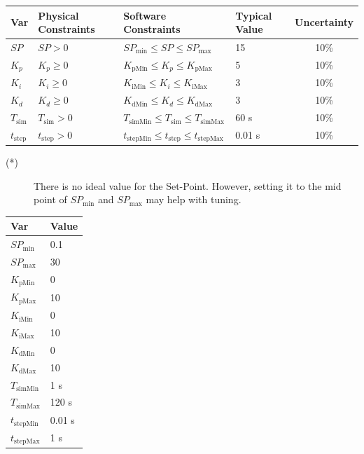 \documentclass[12pt]{article}
\begin{document}
\begin{table}[!h]
  \caption{Input Variables} \label{TblInputVar}
  \renewcommand{\arraystretch}{1.2}
\noindent \begin{longtable*}{l l l l c} 
  \toprule
  \textbf{Var} & \textbf{Physical Constraints} & \textbf{Software Constraints} &
                             \textbf{Typical Value} & \textbf{Uncertainty}\\
  \midrule 
  $SP$ & $SP > 0$ & $SP_{\text{min}} \leq SP \leq SP_{\text{max}}$ & 
  15 & 10\%
  \\
  $K_p$ & $K_p \geq 0$ & $K_\text{pMin} \leq K_p \leq K_\text{pMax}$ & 
  5 & 10\%
  \\
  $K_i$ & $K_i \geq 0$ & $K_{\text{iMin}} \leq K_i \leq K_{\text{iMax}}$ & 
  3 & 10\%
  \\
  $K_d$ & $K_d \geq 0$ & $K_{\text{dMin}} \leq K_d \leq K_{\text{dMax}}$ & 
  3 & 10\%
  \\
  $T_\text{sim}$ & $T_\text{sim} > 0$ & $T_\text{simMin} \leq T_\text{sim} \leq 
  T_\text{simMax}$ & 60 \si[per-mode=symbol] {\second} & 10\%
  \\
  $t_\text{step}$ & $t_\text{step} > 0$ & $t_\text{stepMin} \leq t_\text{step} 
  \leq t_\text{stepMax}$ & 0.01 \si[per-mode=symbol] {\second} & 10\%
  \\
  \bottomrule
\end{longtable*}
\end{table}

\noindent 
\begin{description}
\item[(*)] 
There is no ideal value for the Set-Point. However, setting it to the mid 
point of $SP_{\text{min}}$ and $SP_{\text{max}}$ may help with tuning.
\end{description}


\begin{table}[!h]
\caption{Specification Parameter Values} \label{TblSpecParams}
\renewcommand{\arraystretch}{1.2}
\noindent \begin{longtable*}{l l} 
  \toprule
  \textbf{Var} & \textbf{Value} \\
  \midrule 
  $SP_{\text{min}}$ & 0.1\\
  $SP_{\text{max}}$ & 30\\
  $K_\text{pMin}$ & 0  \\
  $K_\text{pMax}$ & 10 \\
  $K_\text{iMin}$ & 0 \\
  $K_\text{iMax}$ & 10 \\
  $K_\text{dMin}$ & 0 \\
  $K_\text{dMax}$ & 10 \\
  $T_\text{simMin}$ & 1 \si{\second}\\
  $T_\text{simMax}$ & 120 \si{\second}\\
  $t_\text{stepMin}$ & 0.01 \si{\second}\\
  $t_\text{stepMax}$ & 1 \si{\second}\\
  \bottomrule
\end{longtable*}
\end{table}
\end{document}
